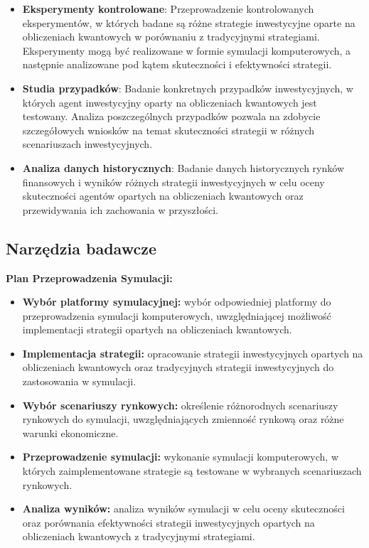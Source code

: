 \documentclass[polish,envcountsect,10pt]{article}
\begin{document}
\begin{itemize}
    \item \textbf{Eksperymenty kontrolowane}: Przeprowadzenie kontrolowanych eksperymentów, w których badane są różne strategie inwestycyjne oparte na obliczeniach kwantowych w porównaniu z tradycyjnymi strategiami. Eksperymenty mogą być realizowane w formie symulacji komputerowych, a następnie analizowane pod kątem skuteczności i efektywności strategii.
    
    \item \textbf{Studia przypadków}: Badanie konkretnych przypadków inwestycyjnych, w których agent inwestycyjny oparty na obliczeniach kwantowych jest testowany. Analiza poszczególnych przypadków pozwala na zdobycie szczegółowych wniosków na temat skuteczności strategii w różnych scenariuszach inwestycyjnych.
    
    \item \textbf{Analiza danych historycznych}: Badanie danych historycznych rynków finansowych i wyników różnych strategii inwestycyjnych w celu oceny skuteczności agentów opartych na obliczeniach kwantowych oraz przewidywania ich zachowania w przyszłości.
\end{itemize}

\subsection{Narzędzia badawcze}

\textbf{Plan Przeprowadzenia Symulacji:}
\begin{itemize}
	\item \textbf{Wybór platformy symulacyjnej:} wybór odpowiedniej platformy do przeprowadzenia symulacji komputerowych, uwzględniającej możliwość implementacji strategii opartych na obliczeniach kwantowych.
    
	\item \textbf{Implementacja strategii:} opracowanie strategii inwestycyjnych opartych na obliczeniach kwantowych oraz tradycyjnych strategii inwestycyjnych do zastosowania w symulacji.
    
	\item \textbf{Wybór scenariuszy rynkowych:} określenie różnorodnych scenariuszy rynkowych do symulacji, uwzględniających zmienność rynkową oraz różne warunki ekonomiczne.
    
	\item \textbf{Przeprowadzenie symulacji:} wykonanie symulacji komputerowych, w których zaimplementowane strategie są testowane w wybranych scenariuszach rynkowych.
    
	\item \textbf{Analiza wyników:} analiza wyników symulacji w celu oceny skuteczności oraz porównania efektywności strategii inwestycyjnych opartych na obliczeniach kwantowych z tradycyjnymi strategiami.
\end{itemize}
\end{document}
